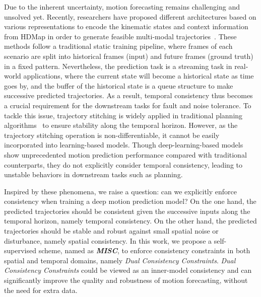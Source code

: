 \documentclass[10pt,twocolumn,letterpaper]{article}
\begin{document}
Due to the inherent uncertainty, motion forecasting remains challenging and unsolved yet. Recently, researchers have proposed different architectures based on various representations to encode the kinematic states and context information from HDMap in order to generate feasible multi-modal trajectories~\cite{bansal2018chauffeurnet,chai2019multipath,gao2020vectornet,gu2021densetnt,liang2020learning,liu2021multimodal,ngiam2021scene,varadarajan2021multipath++,ye2021tpcn,zeng2021lanercnn,zhao2020tnt}. These methods follow a traditional static training pipeline, where frames of each scenario are split into historical frames (input) and future frames (ground truth) in a fixed pattern. Nevertheless, the prediction task is a streaming task in real-world applications, where the current state will become a historical state as time goes by, and the buffer of the historical state is  a queue structure to make successive predicted trajectories. As a result, temporal consistency thus becomes a crucial requirement for the downstream tasks for fault and noise tolerance. To tackle this issue, trajectory stitching is widely applied in traditional planning algorithms~\cite{fan2018baidu} to ensure stability along the temporal horizon. However, as the trajectory stitching operation is non-differentiable, it cannot be easily incorporated into learning-based models. Though deep-learning-based models show unprecedented motion prediction performance compared with traditional counterparts,  they do not explicitly consider temporal consistency, leading to unstable behaviors in downstream tasks such as planning.

Inspired by these phenomena, we raise a question: can we explicitly enforce consistency when training a deep motion prediction model? On the one hand, the predicted trajectories should be consistent given the successive inputs along the temporal horizon, namely temporal consistency. On the other hand, the predicted trajectories should be stable and robust  against small spatial noise or disturbance, namely spatial consistency. In this work, we propose a self-supervised scheme, named as \textbf{\emph{MISC}}, to enforce consistency constraints in both spatial and temporal domains, namely \emph{Dual Consistency Constraints}. \emph{Dual Consistency Constraints} could be viewed as an inner-model consistency and can significantly improve  the quality and robustness of motion forecasting, without the need for extra data.  
\end{document}
